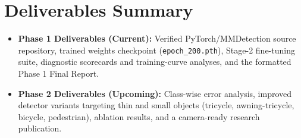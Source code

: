 \documentclass[12pt,a4paper]{report}
\begin{document}
\section{Deliverables Summary}
\begin{itemize}[leftmargin=2em]
    \item \textbf{Phase 1 Deliverables (Current):} Verified PyTorch/MMDetection source repository, trained weights checkpoint (\texttt{epoch\_200.pth}), Stage-2 fine-tuning suite, diagnostic scorecards and training-curve analyses, and the formatted Phase 1 Final Report.
    \item \textbf{Phase 2 Deliverables (Upcoming):} Class-wise error analysis, improved detector variants targeting thin and small objects (tricycle, awning-tricycle, bicycle, pedestrian), ablation results, and a camera-ready research publication.
\end{itemize}
\end{document}
